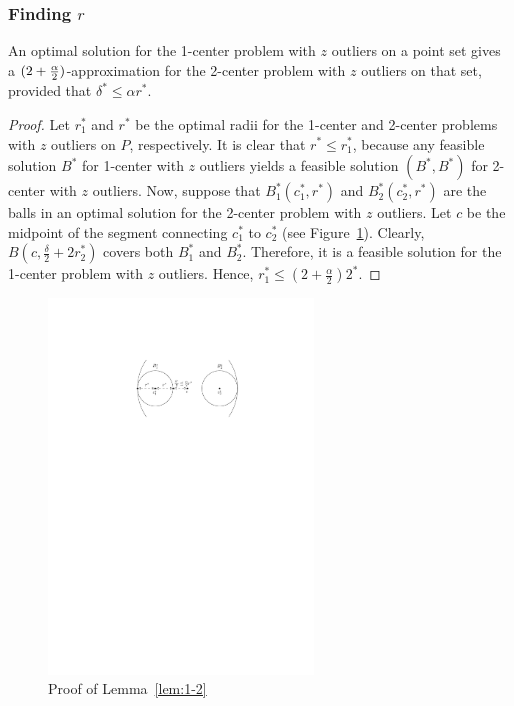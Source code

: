 \documentclass[envcountsame]{cls/cccg15}
\newcommand{\lee}{\leqslant}
\renewcommand{\le}{\lee}
\begin{document}
\subsubsection{Finding $r$}
\label{subsec:findr}


\begin{lemma}
\label{lem:1-2}
	An optimal solution for the 1-center problem with $z$ outliers on a point set
	gives a $(2 + {\alpha \over 2})$-approximation for
	the 2-center problem with $z$ outliers on that set,
	provided that $\delta^* \le \alpha r^*$.
\end{lemma}



\begin{proof}
Let $r_1^*$ and $r^*$ be the optimal radii for
the 1-center and 2-center problems with $z$ outliers on $P$, respectively.
It is clear that $r^* \le r_1^*$,
because any feasible solution $B^*$ for 1-center with $z$ outliers
yields a feasible solution $(B^*, B^*)$ for 2-center with $z$ outliers.
Now, suppose that $B_1^*(c_1^*, r^*)$ and $B_2^*(c_2^*, r^*)$
are the balls in an optimal solution for the 2-center problem with $z$ outliers.
Let $c$ be the midpoint of the segment connecting 
$c_1^*$ to $c_2^*$ (see Figure~\ref{fig:2lt1}).
Clearly, $B\left(c, \frac{\delta}{2} + 2r_2^*\right)$ covers both $B_1^*$ and $B_2^*$. 
Therefore, it is a feasible solution for the 1-center problem with $z$ outliers.
Hence, $ r_1^* \le \left(2 + \frac{\alpha}{2}\right) 2^*$.
\end{proof}

\begin{figure}[th]
	\centering
	\includegraphics[width=19em]{figs/2lt1}
	\caption{Proof of Lemma~\ref{lem:1-2}}
	\label{fig:2lt1}
\end{figure}
\end{document}
